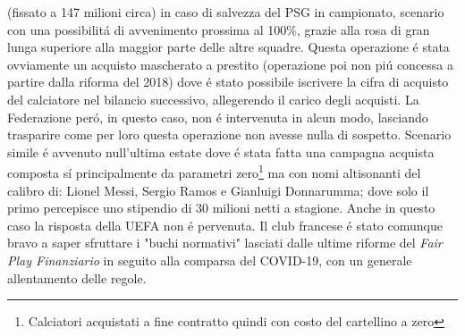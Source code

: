 \documentclass[
    corpo=12pt,
    oneside,
    evenboxes,
    tipotesi=triennale,
    stile=classica,
    oldstyle,
    autoretitolo,
    greek,
]{toptesi}
\begin{document}
\begin{interlinea}{1.5}
(fissato a 147 milioni circa) in caso di salvezza del PSG in campionato,
scenario con una possibilit\'a di avvenimento prossima al 100\%, grazie alla rosa di gran lunga superiore alla maggior parte delle altre squadre.
Questa operazione \'e stata ovviamente un acquisto mascherato a prestito (operazione poi non pi\'u concessa a partire dalla riforma del 2018) dove
\'e stato possibile iscrivere la cifra di acquisto del calciatore nel bilancio successivo, allegerendo il carico degli acquisti. La Federazione 
per\'o, in questo caso, non \'e intervenuta in alcun modo, lasciando trasparire come per loro questa operazione non avesse nulla di sospetto. 
Scenario simile \'e avvenuto null'ultima estate dove \'e stata fatta una campagna acquista composta s\'i principalmente da parametri zero\footnote{Calciatori acquistati a fine contratto quindi con costo del cartellino a zero}
ma con nomi altisonanti del calibro di: Lionel Messi, Sergio Ramos e Gianluigi Donnarumma; dove solo il primo percepisce uno stipendio di 30 milioni
netti a stagione. Anche in questo caso la risposta della UEFA non \'e pervenuta. Il club francese \'e stato comunque bravo a saper sfruttare
i "buchi normativi" lasciati dalle ultime riforme del \emph{Fair Play Finanziario} in seguito alla comparsa del COVID-19, con un generale
allentamento delle regole.

\end{interlinea}
\end{document}
